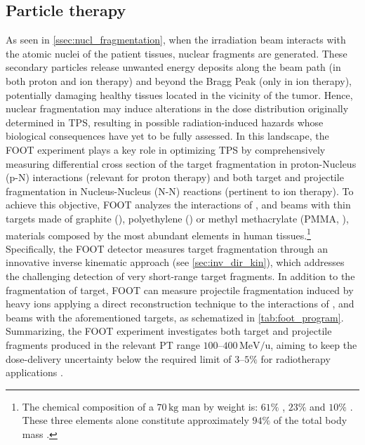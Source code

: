 \subsection{Particle therapy}\label{ssec:particle_therapy}
As seen in \autoref{ssec:nucl_fragmentation}, when the irradiation beam interacts with the atomic nuclei of the patient tissues, nuclear fragments are generated. These secondary particles release unwanted energy deposits along the beam path (in both proton and ion therapy) and beyond the Bragg Peak (only in ion therapy), potentially damaging healthy tissues located in the vicinity of the tumor. Hence, nuclear fragmentation may induce alterations in the dose distribution originally determined in TPS, resulting in possible radiation-induced hazards whose biological consequences have yet to be fully assessed. In this landscape, the FOOT experiment plays a key role in optimizing TPS by comprehensively measuring differential cross section of the target fragmentation in proton-Nucleus (p-N) interactions (relevant for proton therapy) and both target and projectile fragmentation in Nucleus-Nucleus (N-N) reactions (pertinent to ion therapy). To achieve this objective, FOOT analyzes the interactions of ,  and  beams with thin targets made of graphite (), polyethylene () or methyl methacrylate (PMMA, ), materials composed by the most abundant elements in human tissues.\footnote{The chemical composition of a $70\,\mathrm{kg}$ man by weight is: $61\%$ , $23\%$  and $10\%$ . These three elements alone constitute approximately $94\%$ of the total body mass \cite{haynes2016crc}.} Specifically, the FOOT detector measures target fragmentation through an innovative inverse kinematic approach (see \autoref{sec:inv_dir_kin}), which addresses the challenging detection of very short-range target fragments. In addition to the fragmentation of target, FOOT can measure projectile fragmentation induced by heavy ions applying a direct reconstruction technique to the interactions of ,  and  beams with the aforementioned targets, as schematized in \autoref{tab:foot_program}. Summarizing, the FOOT experiment investigates both target and projectile fragments produced in the relevant PT range $100$--$400\,\mathrm{MeV/u}$, aiming to keep the dose-delivery uncertainty below the required limit of $3$--$5\%$ for radiotherapy applications \cite{vanDeMerwe02012017,Thwaites_2013,PLESKAC2012130}.
